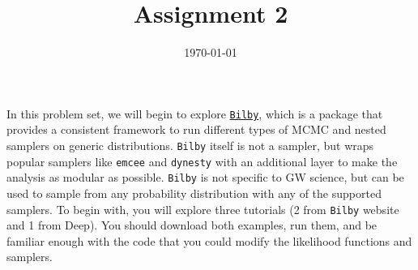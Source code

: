 \documentclass[
    aps,
    10pt,
    prd,
    notitlepage,
    onecolumn,s
    tightenlines,
    nofootinbib]{revtex4-1}
\newcommand{\software}[1]{\texttt{#1}}
\begin{document}
\title{Assignment 2}
\date{\today}
\maketitle
In this problem set, we will begin to explore \href{https://git.ligo.org/lscsoft/bilby}{\software{Bilby}}, which is a package that provides a consistent framework to run different types of MCMC and nested samplers on generic distributions. 
\software{Bilby} itself is not a sampler, but wraps popular samplers like \software{emcee} and \software{dynesty} with an additional layer to make the analysis as modular as possible. 
\software{Bilby} is not specific to GW science, but can be used to sample from any probability distribution with any of the supported samplers.
To begin with, you will explore three tutorials (2 from \software{Bilby} website and 1 from Deep).
You should download both examples, run them, and be familiar enough with the code that you could modify the likelihood functions and samplers.
\end{document}
